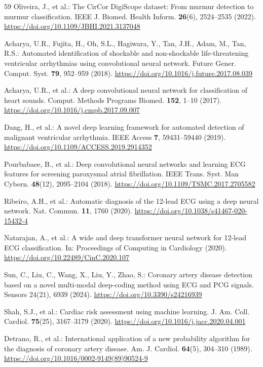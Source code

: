 \documentclass[AMA,STIX1COL,]{WileyNJD-v2}
\begin{document}
\begin{thebibliography}{59}
Oliveira, J., et al.: The CirCor DigiScope dataset: From murmur detection to murmur classification. IEEE J. Biomed. Health Inform. \textbf{26}(6), 2524--2535 (2022). \url{https://doi.org/10.1109/JBHI.2021.3137048}

Acharya, U.R., Fujita, H., Oh, S.L., Hagiwara, Y., Tan, J.H., Adam, M., Tan, R.S.: Automated identification of shockable and non-shockable life-threatening ventricular arrhythmias using convolutional neural network. Future Gener. Comput. Syst. \textbf{79}, 952--959 (2018). \url{https://doi.org/10.1016/j.future.2017.08.039}

Acharya, U.R., et al.: A deep convolutional neural network for classification of heart sounds. Comput. Methods Programs Biomed. \textbf{152}, 1--10 (2017). \url{https://doi.org/10.1016/j.cmpb.2017.09.007}

Dang, H., et al.: A novel deep learning framework for automated detection of malignant ventricular arrhythmia. IEEE Access \textbf{7}, 59431--59440 (2019). \url{https://doi.org/10.1109/ACCESS.2019.2914352}

Pourbabaee, B., et al.: Deep convolutional neural networks and learning ECG features for screening paroxysmal atrial fibrillation. IEEE Trans. Syst. Man Cybern. \textbf{48}(12), 2095--2104 (2018). \url{https://doi.org/10.1109/TSMC.2017.2705582}

Ribeiro, A.H., et al.: Automatic diagnosis of the 12-lead ECG using a deep neural network. Nat. Commun. \textbf{11}, 1760 (2020). \url{https://doi.org/10.1038/s41467-020-15432-4}

Natarajan, A., et al.: A wide and deep transformer neural network for 12-lead ECG classification. In: Proceedings of Computing in Cardiology (2020). \url{https://doi.org/10.22489/CinC.2020.107}

Sun, C., Liu, C., Wang, X., Liu, Y., Zhao, S.: Coronary artery disease detection based on a novel multi-modal deep-coding method using ECG and PCG signals. Sensors 24(21), 6939 (2024). \url{https://doi.org/10.3390/s24216939}

Shah, S.J., et al.: Cardiac risk assessment using machine learning. J. Am. Coll. Cardiol. \textbf{75}(25), 3167--3179 (2020). \url{https://doi.org/10.1016/j.jacc.2020.04.001}

Detrano, R., et al.: International application of a new probability algorithm for the diagnosis of coronary artery disease. Am. J. Cardiol. \textbf{64}(5), 304--310 (1989). \url{https://doi.org/10.1016/0002-9149(89)90524-9}


\end{thebibliography}
\end{document}
